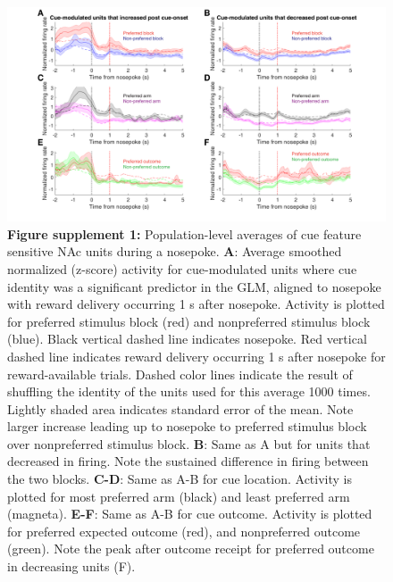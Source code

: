 \documentclass[11pt]{article}
\newcommand{\bsf}[1]{\textbf{#1}}
\begin{document}
 \begin{figure}[ht!]
\centering
\includegraphics[width=\textwidth]{Fig 9 - SUPP NP Population averages.pdf}
\caption*{\bsf{Figure supplement 1:} Population-level averages of cue feature sensitive NAc units during a
  nosepoke. \bsf{A}: Average smoothed normalized (z-score) activity for cue-modulated
  units where cue identity was a significant predictor in the GLM, aligned to
  nosepoke with reward delivery occurring 1 s after nosepoke. Activity is
  plotted for preferred stimulus block (red) and nonpreferred stimulus block
  (blue). Black vertical dashed line indicates nosepoke. Red vertical dashed line indicates reward
  delivery occurring 1 s after nosepoke for reward-available trials. Dashed color lines indicate the result of shuffling the identity of the units used for this average 1000 times. Lightly
  shaded area indicates standard error of the mean. Note larger increase leading
  up to nosepoke to preferred stimulus block over nonpreferred stimulus
  block. \bsf{B}: Same as A but for units that decreased in firing. Note the
  sustained difference in firing between the two blocks. \bsf{C-D}: Same as A-B
  for cue location. Activity is plotted for most preferred arm (black) and least preferred arm (magneta). \bsf{E-F}: Same as A-B for cue outcome. Activity is plotted for
  preferred expected outcome (red), and nonpreferred outcome (green). Note the
  peak after outcome receipt for preferred outcome in decreasing units (F).}
\label{fig:NP_pop}
\end{figure} \clearpage
\end{document}
